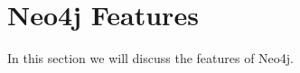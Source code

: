 
\section{Neo4j Features} \label{features}

In this section we will discuss the features of Neo4j.

